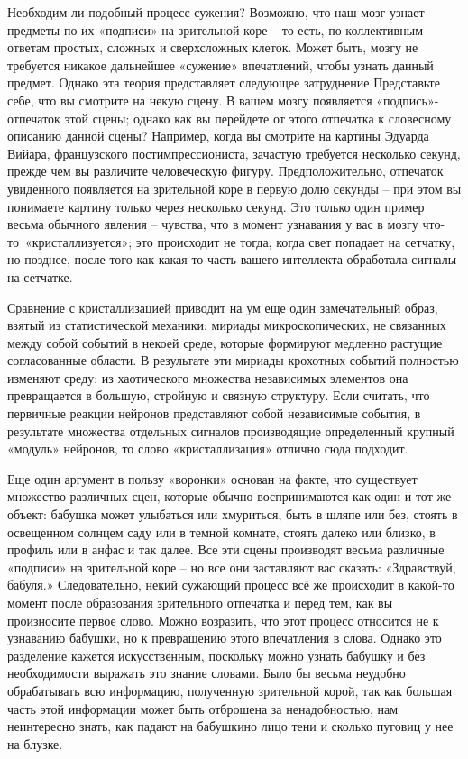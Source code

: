 \documentclass[../main.tex]{subfiles}
\begin{document}
Необходим ли подобный процесс сужения? Возможно, что наш мозг узнает предметы по их «подписи» на зрительной коре \--- то есть, по коллективным ответам простых, сложных и сверхсложных клеток. Может быть, мозгу не требуется никакое дальнейшее «сужение» впечатлений, чтобы узнать данный предмет. Однако эта теория представляет следующее затруднение Представьте себе, что вы смотрите на некую сцену. В вашем мозгу появляется «подпись»-отпечаток этой сцены; однако как вы перейдете от этого отпечатка к словесному описанию данной сцены? Например, когда вы смотрите на картины Эдуарда Вийара, французского постимпрессиониста, зачастую требуется несколько секунд, прежде чем вы различите человеческую фигуру. Предположительно, отпечаток увиденного появляется на зрительной коре в первую долю секунды \--- при этом вы понимаете картину только через несколько секунд. Это только один пример весьма обычного явления \--- чувства, что в момент узнавания у вас в мозгу что-то~«кристаллизуется»; это происходит не тогда, когда свет попадает на сетчатку, но позднее, после того как какая-то часть вашего интеллекта обработала сигналы на сетчатке.

Сравнение с кристаллизацией приводит на ум еще один замечательный образ, взятый из статистической механики: мириады микроскопических, не связанных между собой событий в некоей среде, которые формируют медленно растущие согласованные области. В результате эти мириады крохотных событий полностью изменяют среду: из хаотического множества независимых элементов она превращается в большую, стройную и связную структуру. Если считать, что первичные реакции нейронов представляют собой независимые события, в результате множества отдельных сигналов производящие определенный крупный «модуль» нейронов, то слово «кристаллизация» отлично сюда подходит.

Еще один аргумент в пользу «воронки» основан на факте, что существует множество различных сцен, которые обычно воспринимаются как один и тот же объект: бабушка может улыбаться или хмуриться, быть в шляпе или без, стоять в освещенном солнцем саду или в темной комнате, стоять далеко или близко, в профиль или в анфас и так далее. Все эти сцены производят весьма различные «подписи» на зрительной коре \--- но все они заставляют вас сказать: «Здравствуй, бабуля.» Следовательно, некий сужающий процесс всё же происходит в какой-то момент после образования зрительного отпечатка и перед тем, как вы произносите первое слово. Можно возразить, что этот процесс относится не к узнаванию бабушки, но к превращению этого впечатления в слова. Однако это разделение кажется искусственным, поскольку можно узнать бабушку и без необходимости выражать это знание словами. Было бы весьма неудобно обрабатывать всю информацию, полученную зрительной корой, так как большая часть этой информации может быть отброшена за ненадобностью, нам неинтересно знать, как падают на бабушкино лицо тени и сколько пуговиц у нее на блузке.
\end{document}
